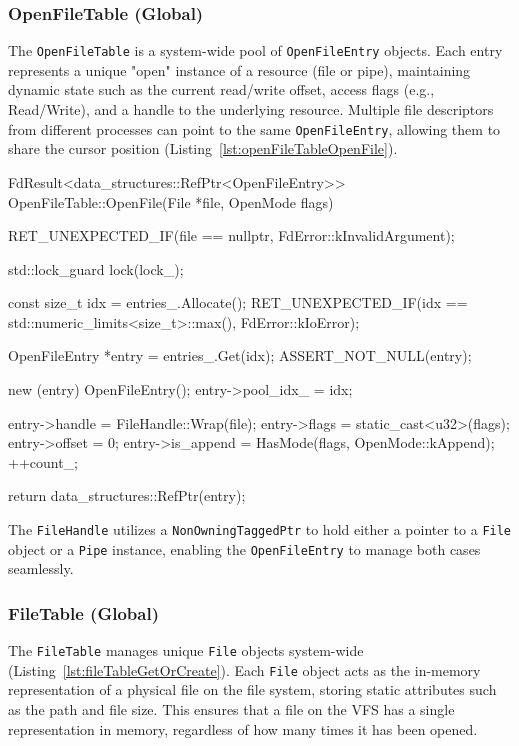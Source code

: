 \documentclass[a4paper,10pt,twoside]{report}
\theoremstyle{definition}
\begin{document}
\subsubsection{OpenFileTable (Global)}

The \texttt{OpenFileTable} is a system-wide pool of \texttt{OpenFileEntry} objects. Each entry represents a unique "open" instance of a resource (file or pipe), maintaining dynamic state such as the current read/write offset, access flags (e.g., Read/Write), and a handle to the underlying resource. Multiple file descriptors from different processes can point to the same \texttt{OpenFileEntry}, allowing them to share the cursor position (Listing~\ref{lst:openFileTableOpenFile}).

\begin{cppcode}[caption={OpenFileTable Creation}, label={lst:openFileTableOpenFile}]
FdResult<data_structures::RefPtr<OpenFileEntry>> OpenFileTable::OpenFile(File *file, OpenMode flags)
{
    RET_UNEXPECTED_IF(file == nullptr, FdError::kInvalidArgument);

    std::lock_guard lock(lock_);

    const size_t idx = entries_.Allocate();
    RET_UNEXPECTED_IF(idx == std::numeric_limits<size_t>::max(), FdError::kIoError);

    OpenFileEntry *entry = entries_.Get(idx);
    ASSERT_NOT_NULL(entry);

    new (entry) OpenFileEntry();
    entry->pool_idx_ = idx;

    entry->handle    = FileHandle::Wrap(file);
    entry->flags     = static_cast<u32>(flags);
    entry->offset    = 0;
    entry->is_append = HasMode(flags, OpenMode::kAppend);
    ++count_;

    return data_structures::RefPtr(entry);
}
\end{cppcode}

The \texttt{FileHandle} utilizes a \texttt{NonOwningTaggedPtr} to hold either a pointer to a \texttt{File} object or a \texttt{Pipe} instance, enabling the \texttt{OpenFileEntry} to manage both cases seamlessly.

\clearpage


\subsubsection{FileTable (Global)}
The \texttt{FileTable} manages unique \texttt{File} objects system-wide (Listing~\ref{lst:fileTableGetOrCreate}). Each \texttt{File} object acts as the in-memory representation of a physical file on the file system, storing static attributes such as the path and file size. This ensures that a file on the VFS has a single representation in memory, regardless of how many times it has been opened.
\end{document}

